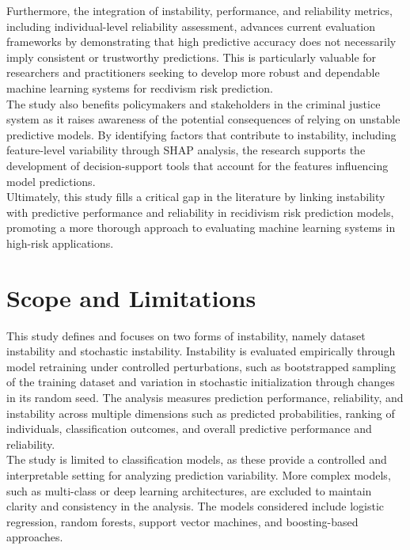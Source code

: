 \documentclass[12pt]{article}
\begin{document}
Furthermore, the integration of instability, performance, and reliability metrics, including individual-level reliability assessment, advances current evaluation frameworks by demonstrating that high predictive accuracy does not necessarily imply consistent or trustworthy predictions. This is particularly valuable for researchers and practitioners seeking to develop more robust and dependable machine learning systems for recdivism risk prediction.\\

The study also benefits policymakers and stakeholders in the criminal justice system as it raises awareness of the potential consequences of relying on unstable predictive models. By identifying factors that contribute to instability, including feature-level variability through SHAP analysis, the research supports the development of decision-support tools that account for the features influencing model predictions.\\

Ultimately, this study fills a critical gap in the literature by linking instability with predictive performance and reliability in recidivism risk prediction models, promoting a more thorough approach to evaluating machine learning systems in high-risk applications.

\section{Scope and Limitations} 
\tab This study defines and focuses on two forms of instability, namely dataset instability and stochastic instability. Instability is evaluated empirically through model retraining under controlled perturbations, such as  bootstrapped sampling of the training dataset and variation in stochastic initialization through changes in its random seed. The analysis measures prediction performance, reliability, and instability across multiple dimensions such as predicted probabilities, ranking of individuals, classification outcomes, and overall predictive performance and reliability.\\

The study is limited to classification models, as these provide a controlled and interpretable setting for analyzing prediction variability. More complex models, such as multi-class or deep learning architectures, are excluded to maintain clarity and consistency in the analysis. The models considered include logistic regression, random forests, support vector machines, and boosting-based approaches.\\
\end{document}
